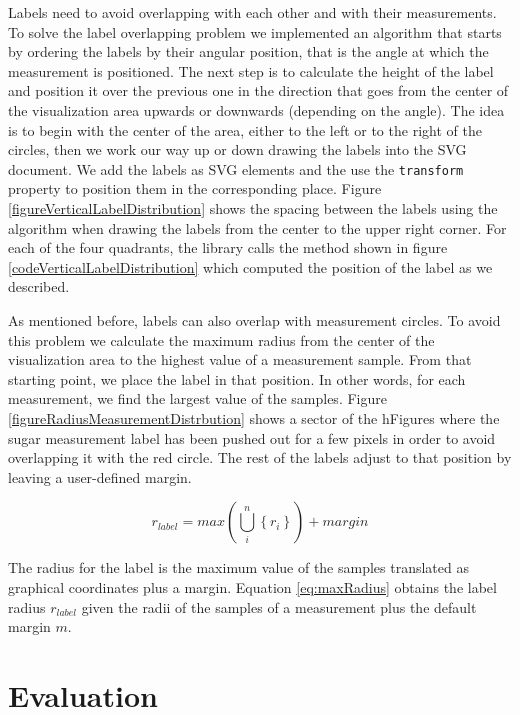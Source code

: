 \documentclass[twocolumn]{bmcart}%
\begin{document}
Labels need to avoid overlapping with each other and with their measurements. To solve the label overlapping problem we implemented an algorithm that starts by ordering the labels by their angular position, that is the angle at which the measurement is positioned. The next step is to calculate the height of the label and position it over the previous one in the direction that goes from the center of the visualization area upwards or downwards (depending on the angle). The idea is to begin with the center of the area, either to the left or to the right of the circles, then we work our way up or down drawing the labels into the SVG document. We add the labels as SVG elements and the use the \texttt{transform} property to position them in the corresponding place. Figure \ref{figureVerticalLabelDistribution} shows the spacing between the labels using the algorithm when drawing the labels from the center to the upper right corner. For each of the four quadrants, the library calls the method shown in figure \ref{codeVerticalLabelDistribution} which computed the position of the label as we described.

As mentioned before, labels can also overlap with measurement circles. To avoid this problem we calculate the maximum radius from the center of the visualization area to the highest value of a measurement sample. From that starting point, we place the label in that position. In other words, for each measurement, we find the largest value of the samples. Figure \ref{figureRadiusMeasurementDistrbution} shows a sector of the hFigures where the sugar measurement label has been pushed out for a few pixels in order to avoid overlapping it with the red circle. The rest of the labels adjust to that position by leaving a user-defined margin.

\begin{equation} \label{eq:maxRadius}
	r_{label} = max(\bigcup_{i}^{n} \left \{ r_{i} \right \} ) + \textit{margin}
\end{equation}

The radius for the label is the maximum value of the samples translated as graphical coordinates plus a margin. Equation \ref{eq:maxRadius} obtains the label radius $r_{label}$ given the radii of the samples of a measurement plus the default margin $m$.

\section*{Evaluation}
\end{document}
